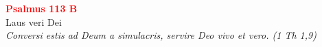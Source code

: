 
\def\greinitialformat#1{%
{\fontsize{39}{39}\selectfont #1}%
}




\vspace{0.3cm}
\begin{center}
 \textcolor{red}{\large \bf Psalmus 113 B}\\
Laus veri Dei\\
\textit{\small Conversi estis ad Deum a simulacris, servire Deo vivo et vero. (1 Th 1,9)}
\end{center}
